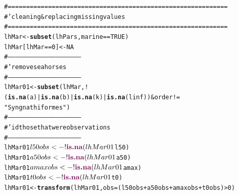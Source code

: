 \documentclass[a4paper]{article}\usepackage{graphicx, color}
\makeatletter
\newcommand{\hlfunctioncall}[1]{\textcolor[rgb]{0.501960784313725,0,0.329411764705882}{\textbf{#1}}}%
\newcommand{\hlstring}[1]{\textcolor[rgb]{0.6,0.6,1}{#1}}%
\newcommand{\hlcomment}[1]{\textcolor[rgb]{0.180392156862745,0.6,0.341176470588235}{#1}}%
\newenvironment{kframe}{%
 \def\at@end@of@kframe{}%
 \ifinner\ifhmode%
  \def\at@end@of@kframe{\end{minipage}}%
  \begin{minipage}{\columnwidth}%
 \fi\fi%
 \def\FrameCommand##1{\hskip\@totalleftmargin \hskip-\fboxsep
 \colorbox{shadecolor}{##1}\hskip-\fboxsep
     \hskip-\linewidth \hskip-\@totalleftmargin \hskip\columnwidth}%
 \MakeFramed {\advance\hsize-\width
   \@totalleftmargin\z@ \linewidth\hsize
   \@setminipage}}%
 {\par\unskip\endMakeFramed%
 \at@end@of@kframe}
\newenvironment{knitrout}{}{} %
\makeatother
\begin{document}
\begin{knitrout}
\color{fgcolor}\begin{kframe}
\begin{alltt}
\hlcomment{# ============================================================}
\hlcomment{#' cleaning & replacing missing values}
\hlcomment{# ============================================================}
lhMar <- \hlfunctioncall{subset}(lhPars, marine == TRUE)
lhMar[lhMar == 0] <- NA
\hlcomment{# ------------------------------------------------------------}
\hlcomment{#' remove sea horses}
\hlcomment{# ------------------------------------------------------------}
lhMar01 <- \hlfunctioncall{subset}(lhMar, !(\hlfunctioncall{is.na}(a) | \hlfunctioncall{is.na}(b) | \hlfunctioncall{is.na}(k) | \hlfunctioncall{is.na}(linf)) & order != 
    \hlstring{"Syngnathiformes"})
\hlcomment{# ------------------------------------------------------------}
\hlcomment{#' id those that were observations}
\hlcomment{# ------------------------------------------------------------}
lhMar01$l50obs <- !\hlfunctioncall{is.na}(lhMar01$l50)
lhMar01$a50obs <- !\hlfunctioncall{is.na}(lhMar01$a50)
lhMar01$amaxobs <- !\hlfunctioncall{is.na}(lhMar01$amax)
lhMar01$t0obs <- !\hlfunctioncall{is.na}(lhMar01$t0)
lhMar01 <- \hlfunctioncall{transform}(lhMar01, obs = (l50obs + a50obs + amaxobs + t0obs) > 0)
\end{alltt}
\end{kframe}
\end{knitrout}
\end{document}
